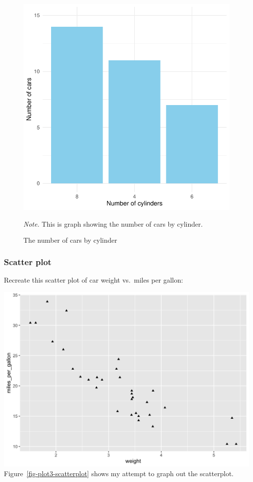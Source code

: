 \documentclass[
  man,
  floatsintext,
  longtable,
  nolmodern,
  notxfonts,
  notimes,
  colorlinks=true,linkcolor=blue,citecolor=blue,urlcolor=blue]{apa7}
\begin{document}
\begin{figure}[H]

{\caption{{The number of cars by cylinder}{\label{fig-plot2-barplot}}}}

\includegraphics{data-visualization_files/figure-pdf/fig-plot2-barplot-1.pdf}

{\noindent \emph{Note.} This is graph showing the number of cars by
cylinder.}

\end{figure}

\subsubsection{Scatter plot}\label{scatter-plot}

Recreate this scatter plot of car weight vs.~miles per gallon:

\includegraphics{plots/plot3.png} Figure~\ref{fig-plot3-scatterplot}
shows my attempt to graph out the scatterplot.
\end{document}
